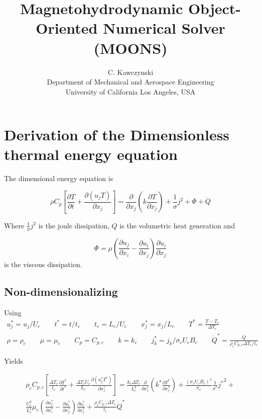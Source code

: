 \documentclass[11pt]{article}
\newcommand{\PD}{\partial}
\begin{document}
\doublespacing
\title{Magnetohydrodynamic Object-Oriented Numerical Solver (MOONS)}
\author{C. Kawczynski \\
Department of Mechanical and Aerospace Engineering \\
University of California Los Angeles, USA\\
}
\maketitle

\section{Derivation of the Dimensionless thermal energy equation}
The dimensional energy equation is

\begin{equation}
\rho C_p \left[ \frac{\PD T}{\PD t} + \frac{\PD (u_j T)}{\PD x_j} \right] = 
\frac{\PD}{\PD x_j} \left( k \frac{\PD T}{\PD x_j} \right) + \frac{1}{\sigma} j^2 + \Phi + \dot{Q}
\end{equation}

Where $\frac{1}{\sigma} j^2$ is the joule dissipation, $Q$ is the volumetric heat generation and

\begin{equation}
\Phi = \mu \left( \frac{\PD u_j}{\PD x_i} - \frac{\PD u_i}{\PD x_j} \right) \frac{\PD u_i}{\PD x_j}
\end{equation}
is the viscous dissipation.

\subsection{Non-dimensionalizing}
Using
\begin{equation}\begin{aligned}
u_j^* = u_j/U_c \qquad t^* = t/t_c \qquad 
t_c = L_c/U_c  \qquad x_j^* = x_j/L_c \qquad 
T^* = \frac{T - T_c}{\Delta T_c} \\
\rho = \rho_c \qquad \mu = \mu_c \qquad
C_p = C_{p,c} \qquad k = k_c \qquad
j_k^* = j_k/ \sigma_c U_c B_c \qquad
\dot{Q}^* = \frac{\dot{Q}}{\rho_c C_{p,c} \Delta T_c / t_c}
\end{aligned}\end{equation}

Yields

\begin{multline}
	\rho_c C_{p,c}
	\left[
	\frac{\Delta T_c}{t_c} \frac{\PD T^*}{\PD t^*} + \frac{\Delta T_c U_c}{L_c} \frac{\PD (u_j^* T^*)}{\PD x_j^*}
	\right]
	= 
	\frac{k_c \Delta T_c}{L_c^2}
	\frac{\PD}{\PD x_j^*}
	\left( k^* \frac{\PD T^*}{\PD x_j^*} \right) +
	\frac{(\sigma_c U_c B_c)^2}{\sigma_c}
	\frac{1}{\sigma^*} {j^*}^2 + \\
	\frac{U_c^2}{L_c^2}\mu_c
	\left( \frac{\PD u_j^*}{\PD x_i^*} - \frac{\PD u_i^*}{\PD x_j^*} \right)
	\frac{\PD u_i^*}{\PD x_j^*} +
	\frac{\rho_c C_{p,c} \Delta T_c}{t_c}
	\dot{Q}^*
\end{multline}
\end{document}
